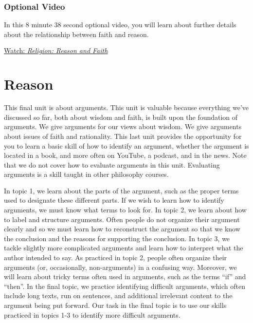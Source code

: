 \documentclass[
]{book}
\begin{document}
\hypertarget{optional-video-7}{%
\subsection*{Optional Video}\label{optional-video-7}}

\begin{reflect}
In this 8 minute 38 second optional video, you will learn about further details about the relationship between faith and reason.

\href{https://www.youtube.com/watch?v=MTPHXNMi9tA}{Watch: \emph{Religion: Reason and Faith}}
\end{reflect}

\hypertarget{reason}{%
\chapter{Reason}\label{reason}}

This final unit is about arguments. This unit is valuable because everything we've discussed so far, both about wisdom and faith, is built upon the foundation of arguments. We give arguments for our views about wisdom. We give arguments about issues of faith and rationality. This last unit provides the opportunity for you to learn a basic skill of how to identify an argument, whether the argument is located in a book, and more often on YouTube, a podcast, and in the news. Note that we do not cover how to evaluate arguments in this unit. Evaluating arguments is a skill taught in other philosophy courses.

In topic 1, we learn about the parts of the argument, such as the proper terms used to designate these different parts. If we wish to learn how to identify arguments, we must know what terms to look for. In topic 2, we learn about how to label and structure arguments. Often people do not organize their argument clearly and so we must learn how to reconstruct the argument so that we know the conclusion and the reasons for supporting the conclusion. In topic 3, we tackle slightly more complicated arguments and learn how to interpret what the author intended to say. As practiced in topic 2, people often organize their arguments (or, occasionally, non-arguments) in a confusing way. Moreover, we will learn about tricky terms often used in arguments, such as the terms ``if'' and ``then''. In the final topic, we practice identifying difficult arguments, which often include long texts, run on sentences, and additional irrelevant content to the argument being put forward. Our task in the final topic is to use our skills practiced in topics 1-3 to identify more difficult arguments.
\end{document}
